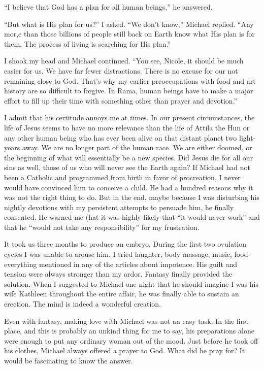 \documentclass[]{article}
\begin{document}
“I believe that God has a plan for all human beings,” he answered.

“But what is His plan for us?” I asked. “We don’t know,” Michael replied. “Any mor,e than those billions of people still back on Earth know what His plan is for them. The process of living is searching for His plan.”

I shook my head and Michael continued. “You see, Nicole, it should be much easier for us. We have far fewer distractions. There is no excuse for our not remaining close to God. That’s why my earlier preoccupations with food and art history are so difficult to forgive. In Rama, human beings have to make a major effort to fill up their time with something other than prayer and devotion.”

I admit that his certitude annoys me at times. In our present circumstances, the life of Jesus seems to have no more relevance than the life of Attila the Hun or any other human being who has ever been alive on that distant planet two light-years away. We are no longer part of the human race. We are either doomed, or the beginning of what will essentially be a new species. Did Jesus die for all our sins as well, those of us who will never see the Earth again? If Michael had not been a Catholic and programmed from birth in favor of procreation, I never would have convinced him to conceive a child. He had a hundred reasons why it was not the right thing to do. But in the end, maybe because I was disturbing his nightly devotions with my persistent attempts to persuade him, he finally consented. He warned me (hat it was highly likely that “it would never work” and that he “would not take any responsibility” for my frustration.

It took us three months to produce an embryo. During the first two ovulation cycles I was unable to arouse him. I tried laughter, body massage, music, food-everything mentioned in any of the articles about impotence. His guilt and tension were always stronger than my ardor. Fantasy finally provided the solution. When I suggested to Michael one night that he should imagine I was his wife Kathleen throughout the entire affair, he was finally able to sustain an erection. The mind is indeed a wonderful creation.

Even with fantasy, making love with Michael was not an easy task. In the first place, and this is probably an unkind thing for me to say, his preparations alone were enough to put any ordinary woman out of the mood. Just before he took off his clothes, Michael always offered a prayer to God. What did he pray for? It would be fascinating to know the answer.
\end{document}
